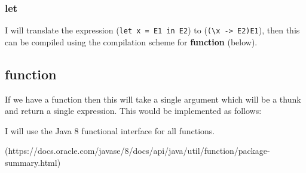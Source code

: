 \documentclass[12pt,a4paper,twoside]{article}
\begin{document}
\subsubsection{let} 

I will translate the expression (\texttt{let x = E1 in E2}) to (\texttt{(\textbackslash x -> E2)E1}), then 
this can be compiled using the compilation scheme for \textbf{function} (below).

\subsection{function}

If we have a function then this will take a single argument which will be a thunk and return a single expression. 
This would be implemented as follows:

I will use the Java 8 functional interface for all functions.

(https://docs.oracle.com/javase/8/docs/api/java/util/function/package-summary.html)
\end{document}
